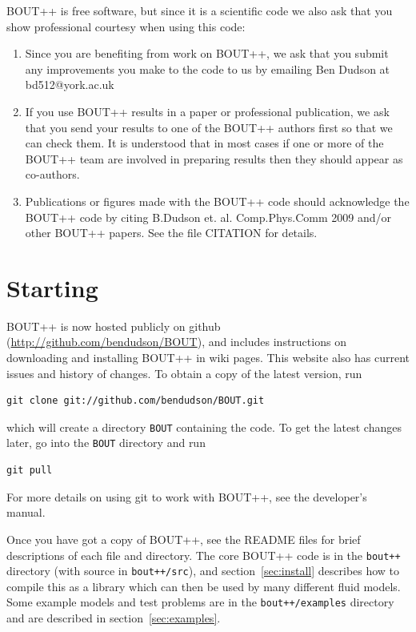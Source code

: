 \documentclass[12pt]{article}
\begin{document}
BOUT++ is free software, but since it is a
scientific code we also ask that you show professional courtesy
when using this code:

\begin{enumerate}
\item Since you are benefiting from work on BOUT++, we ask that you
  submit any improvements you make to the code to us by emailing 
  Ben Dudson at bd512@york.ac.uk
\item If you use BOUT++ results in a paper or professional publication,
  we ask that you send your results to one of the BOUT++ authors
  first so that we can check them. It is understood that in most cases
  if one or more of the BOUT++ team are involved in preparing results
  then they should appear as co-authors.
\item Publications or figures made with the BOUT++ code should acknowledge the
  BOUT++ code by citing B.Dudson et. al. Comp.Phys.Comm 2009 \cite{Dudson2009}
  and/or other BOUT++ papers. See the file CITATION for details.
\end{enumerate}

\section{Starting}

BOUT++ is now hosted publicly on github (\url{http://github.com/bendudson/BOUT}), and includes
instructions on downloading and installing BOUT++ in wiki pages. This website also has current issues
and history of changes. To obtain a copy of the latest version, run 
\begin{verbatim}
git clone git://github.com/bendudson/BOUT.git
\end{verbatim}
which will create a directory \texttt{BOUT} containing the code. To get the latest changes later,
go into the  \texttt{BOUT} directory and run
\begin{verbatim}
git pull
\end{verbatim}
For more details on using git to work with BOUT++, see the developer's manual.

Once you have got a copy of BOUT++, see the README files for brief descriptions of 
each file and directory. The core BOUT++ code is in the
\texttt{bout++} directory (with source in \texttt{bout++/src}), and
section~\ref{sec:install} describes how to compile this as a library which
can then be used by many different fluid models. Some example models and test
problems are in the \texttt{bout++/examples} directory and are described in
section~\ref{sec:examples}.
\end{document}
